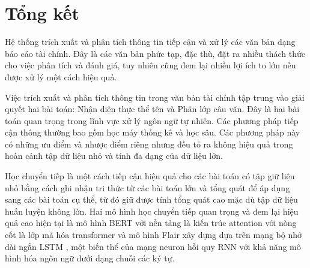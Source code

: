 \documentclass[14pt]{extreport}
\begin{document}
\section{Tổng kết}
Hệ thống trích xuất và phân tích thông tin tiếp cận và xử lý các văn bản dạng báo cáo tài chính. Đây là các văn bản phức tạp, đặc thù, đặt ra nhiều thách thức cho việc phân tích và đánh giá, tuy nhiên cũng đem lại nhiều lợi ích to lớn nếu được xử lý một cách hiệu quả.

Việc trích xuất và phân tích thông tin trong văn bản tài chính tập trung vào giải quyết hai bài toán: Nhận diện thực thể tên và Phân lớp câu văn. Đây là hai bài toán quan trọng trong lĩnh vực xử lý ngôn ngữ tự nhiên. Các phương pháp tiếp cận thông thường bao gồm học máy thống kê và học sâu. Các phương pháp này có những ưu điểm và nhược điểm riêng nhưng đều tỏ ra không hiệu quả trong hoàn cảnh tập dữ liệu nhỏ và tính đa dạng của dữ liệu lớn.

Học chuyển tiếp là một cách tiếp cận hiệu quả cho các bài toán có tập giữ liệu nhỏ bằng cách ghi nhận tri thức từ các bài toán lớn và tổng quát để áp dụng sang các bài toán cụ thể, từ đó giữ được tính tổng quát cao mặc dù tập dữ liệu huấn luyện không lớn. Hai mô hình học chuyển tiếp quan trọng và đem lại hiệu quả cao hiện tại là mô hình BERT với nền tảng là kiến trúc attention với nòng cốt là lớp mã hóa transformer và mô hình Flair xây dựng dựa trên mạng bộ nhớ dài ngắn LSTM , một biến thể của mạng neuron hồi quy RNN với khả năng mô hình hóa ngôn ngữ dưới dạng chuỗi các ký tự.
\end{document}
